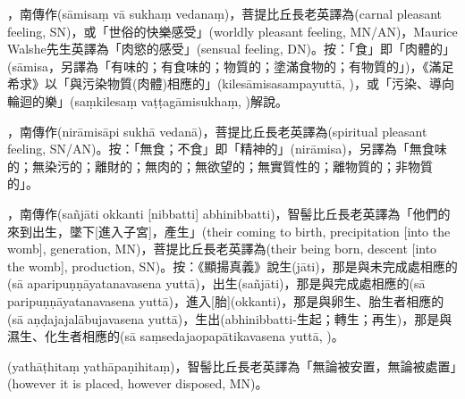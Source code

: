 \startitemgroup[noteitems]
\item{}，南傳作(sāmisaṃ vā sukhaṃ vedanaṃ)，菩提比丘長老英譯為(carnal pleasant feeling, SN)，或「世俗的快樂感受」(worldly pleasant feeling, MN/AN)，Maurice Walshe先生英譯為「肉慾的感受」(sensual feeling, DN)。按：「食」即「肉體的」(sāmisa，另譯為「有味的；有食味的；物質的；塗滿食物的；有物質的」)，《滿足希求》以「與污染物質(肉體)相應的」(kilesāmisasampayuttā, )，或「污染、導向輪迴的樂」(saṃkilesaṃ vaṭṭagāmisukhaṃ, )解說。
\item{}，南傳作(nirāmisāpi sukhā vedanā)，菩提比丘長老英譯為(spiritual pleasant feeling, SN/AN)。按：「無食；不食」即「精神的」(nirāmisa)，另譯為「無食味的；無染污的；離財的；無肉的；無欲望的；無實質性的；離物質的；非物質的」。
\stopitemgroup

\startitemgroup[noteitems]
\item{}，南傳作(sañjāti okkanti [nibbatti] abhinibbatti)，智髻比丘長老英譯為「他們的來到出生，墜下[進入子宮]，產生」(their coming to birth, precipitation [into the womb], generation, MN)，菩提比丘長老英譯為(their being born, descent [into the womb], production, SN)。按：《顯揚真義》說生(jāti)，那是與未完成處相應的(sā aparipuṇṇāyatanavasena yuttā)，出生(sañjāti)，那是與完成處相應的(sā paripuṇṇāyatanavasena yuttā)，進入[胎](okkanti)，那是與卵生、胎生者相應的(sā aṇḍajajalābujavasena yuttā)，生出(abhinibbatti-生起；轉生；再生)，那是與濕生、化生者相應的(sā saṃsedajaopapātikavasena yuttā, )。
\stopitemgroup

\startitemgroup[noteitems]
\item{}(yathāṭhitaṃ yathāpaṇihitaṃ)，智髻比丘長老英譯為「無論被安置，無論被處置」(however it is placed, however disposed, MN)。
\stopitemgroup

